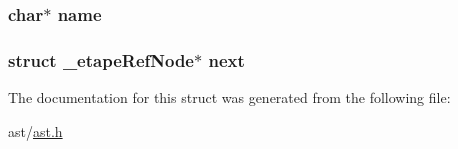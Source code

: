 \subsubsection[{\texorpdfstring{name}{name}}]{\setlength{\rightskip}{0pt plus 5cm}char$\ast$ name}\hypertarget{struct__etape_ref_node_a5ac083a645d964373f022d03df4849c8}{}\label{struct__etape_ref_node_a5ac083a645d964373f022d03df4849c8}
\subsubsection[{\texorpdfstring{next}{next}}]{\setlength{\rightskip}{0pt plus 5cm}struct {\bf \+\_\+etape\+Ref\+Node}$\ast$ next}\hypertarget{struct__etape_ref_node_a7af4a14b465f82d65763ae5982a22dce}{}\label{struct__etape_ref_node_a7af4a14b465f82d65763ae5982a22dce}


The documentation for this struct was generated from the following file\+:\begin{DoxyCompactItemize}
\item 
ast/\hyperlink{ast_8h}{ast.\+h}\end{DoxyCompactItemize}
